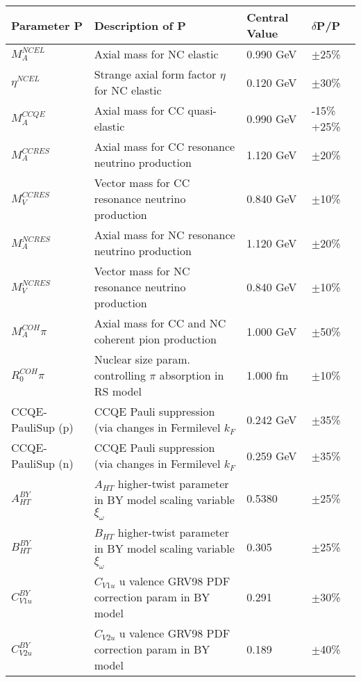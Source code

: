 \documentclass{article}
\begin{document}
\begin{table*}
\centering
{}
\begin{tabular}{| l | l | l | l |}
\hline
   Parameter P & Description of P & Central Value  & $\delta$P/P \\ [0.1ex] \hline
 $M_A^{NCEL}$  & Axial mass for NC elastic & 0.990 GeV & $\pm$25\% \\
 $\eta^{NCEL}$  & Strange axial form factor $\eta$ for NC elastic & 0.120 GeV & $\pm$30\% \\
$M_A^{CCQE}$  & Axial mass for CC quasi-elastic & 0.990 GeV & -15\% +25\% \\
$M_A^{CCRES}$  & Axial mass for CC resonance neutrino production & 1.120 GeV & $\pm$20\% \\
$M_V^{CCRES}$  & Vector mass for CC resonance neutrino production & 0.840 GeV & $\pm$10\% \\
$M_A^{NCRES}$  & Axial mass for NC resonance neutrino production & 1.120 GeV & $\pm$20\% \\
$M_V^{NCRES}$  & Vector mass for NC resonance neutrino production & 0.840 GeV & $\pm$10\% \\
$M_A^{COH}\pi$  & Axial mass for CC and NC coherent pion production & 1.000 GeV & $\pm$50\% \\
$R_0^{COH}\pi$  & Nuclear size param. controlling $\pi$ absorption in RS model & 1.000 fm & $\pm$10\% \\
CCQE-PauliSup (p)  & CCQE Pauli suppression (via changes in Fermilevel $k_F$ & 0.242 GeV & $\pm$35\% \\ 
CCQE-PauliSup (n)   & CCQE Pauli suppression (via changes in Fermilevel $k_F$ & 0.259 GeV & $\pm$35\% \\ \hline

$A_{HT}^{BY}$  & $A_{HT}$ higher-twist parameter in BY model scaling variable $\xi_\omega$ & 0.5380 & $\pm$25\% \\
$B_{HT}^{BY}$  & $B_{HT}$ higher-twist parameter in BY model scaling variable $\xi_\omega$ & 0.305 & $\pm$25\% \\
$C_{V1u}^{BY}$  & $C_{V1u}$ u valence GRV98 PDF correction param in BY model & 0.291 & $\pm$30\% \\
$C_{V2u}^{BY}$  & $C_{V2u}$ u valence GRV98 PDF correction param in BY model & 0.189 & $\pm$40\% \\ \hline


\end{tabular}
\end{table*}
\end{document}
